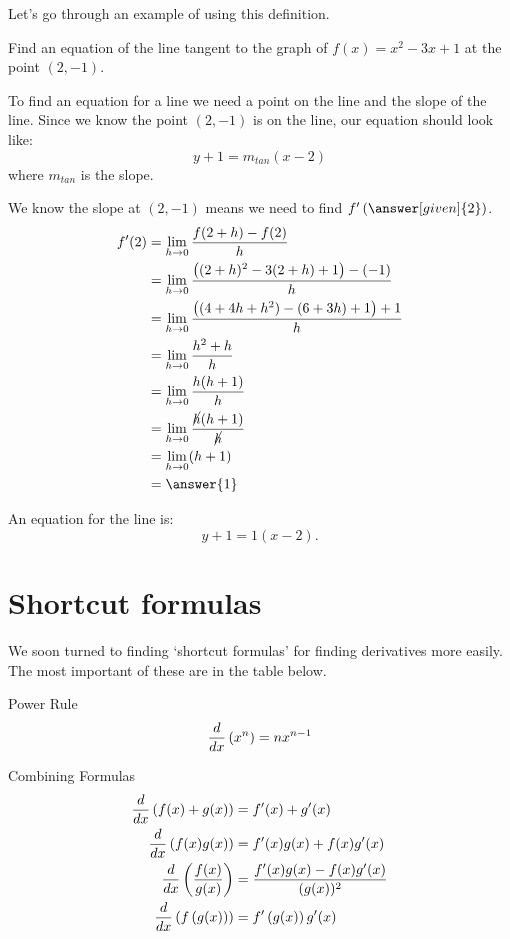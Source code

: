 \documentclass{ximera}
\begin{document}
Let's go through an example of using this definition.
\begin{example}
	Find an equation of the line tangent to the graph of  $f(x) = x^2 - 3x + 1$ at the point $(2, -1)$.
	\begin{explanation}
		To find an equation for a line we need a point on the line and the slope of the line.  Since we know the point
		$(2, -1)$ is on the line, our equation should look like:
		\[ y + 1 = m_{tan} (x-2) \]
		where $m_{tan}$ is the slope.  
		
		We know the slope at $(2, -1)$ means we need to find $f'\left( \answer[given]{2} \right)$.
		\begin{align*}
			f'(2) &= \lim_{h \to 0} \frac{ f(2+h) - f(2) }{h}\\
				&= \lim_{h \to 0} \frac{\left((2+h)^2 - 3(2+h) + 1\right) - \left(  -1 \right)}{h}\\
				&= \lim_{h \to 0} \frac{\left( (4 + 4h + h^2)-(6+3h) + 1\right) +1}{h}\\
				&= \lim_{h \to 0} \frac{h^2+h}{h}\\
				&= \lim_{h \to 0} \frac{h(h+1)}{h}\\
				&= \lim_{h \to 0} \frac{\cancel{h}(h+1)}{\cancel{h}}\\
				&= \lim_{h \to 0} (h+1)\\
				&= \answer{1}
		\end{align*}

		An equation for the line is: \[ y + 1 = 1 (x-2). \]
	\end{explanation}
\end{example}

\section{Shortcut formulas}
We soon turned to finding `shortcut formulas' for finding derivatives more easily.   The most important of these are in the table below.
\begin{xbox}{Power Rule}
\[ \frac{d}{\mathop{}\!d x}\left( x^n \right) = n x^{n-1} \]
\end{xbox}

\begin{xbox}{Combining Formulas}
	\begin{align*}
		\frac{d}{\mathop{}\!d x} \left( f(x) + g(x) \right) 	&= f'(x) + g'(x)\\
		\frac{d}{\mathop{}\!d x} \left( f(x) g(x) \right) 		&= f'(x) g(x) + f(x) g'(x)\\
		\frac{d}{\mathop{}\!d x}\left( \dfrac{f(x)}{g(x)} \right) &= \dfrac{f'(x)g(x) - f(x) g'(x)}{(g(x))^2}\\
		\frac{d}{\mathop{}\!d x} \left( f\left(g(x) \right) \right) &= f'\left( g(x) \right) g'(x)
	\end{align*}
\end{xbox}
\end{document}
